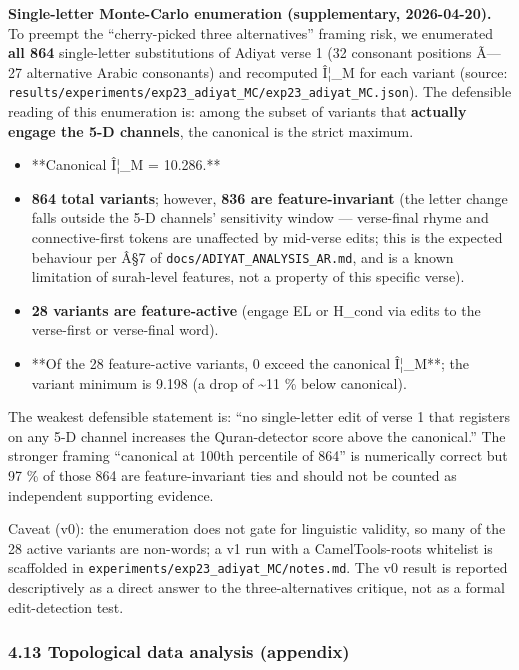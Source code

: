 \documentclass[
]{article}
\providecommand{\tightlist}{%
  \setlength{\itemsep}{0pt}\setlength{\parskip}{0pt}}
\begin{document}
\textbf{Single-letter Monte-Carlo enumeration (supplementary,
2026-04-20).} To preempt the ``cherry-picked three alternatives''
framing risk, we enumerated \textbf{all 864} single-letter substitutions
of Adiyat verse 1 (32 consonant positions Ã--- 27 alternative Arabic
consonants) and recomputed Î¦\_M for each variant (source:
\texttt{results/experiments/exp23\_adiyat\_MC/exp23\_adiyat\_MC.json}).
The defensible reading of this enumeration is: among the subset of
variants that \textbf{actually engage the 5-D channels}, the canonical
is the strict maximum.

\begin{itemize}
\tightlist
\item
  **Canonical Î¦\_M = 10.286.**
\item
  \textbf{864 total variants}; however, \textbf{836 are
  feature-invariant} (the letter change falls outside the 5-D channels'
  sensitivity window --- verse-final rhyme and connective-first tokens
  are unaffected by mid-verse edits; this is the expected behaviour per
  Â§7 of \texttt{docs/ADIYAT\_ANALYSIS\_AR.md}, and is a known
  limitation of surah-level features, not a property of this specific
  verse).
\item
  \textbf{28 variants are feature-active} (engage EL or H\_cond via
  edits to the verse-first or verse-final word).
\item
  **Of the 28 feature-active variants, 0 exceed the canonical Î¦\_M**;
  the variant minimum is 9.198 (a drop of \textasciitilde11 \% below
  canonical).
\end{itemize}

The weakest defensible statement is: ``no single-letter edit of verse 1
that registers on any 5-D channel increases the Quran-detector score
above the canonical.'' The stronger framing ``canonical at 100th
percentile of 864'' is numerically correct but 97 \% of those 864 are
feature-invariant ties and should not be counted as independent
supporting evidence.

Caveat (v0): the enumeration does not gate for linguistic validity, so
many of the 28 active variants are non-words; a v1 run with a
CamelTools-roots whitelist is scaffolded in
\texttt{experiments/exp23\_adiyat\_MC/notes.md}. The v0 result is
reported descriptively as a direct answer to the three-alternatives
critique, not as a formal edit-detection test.

\subsubsection{4.13 Topological data analysis
(appendix)}\label{topological-data-analysis-appendix}
\end{document}
